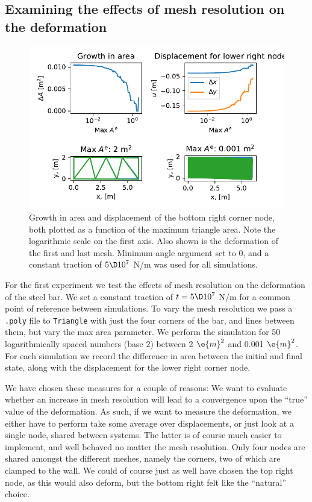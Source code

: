 \documentclass[sigconf]{acmart}
\begin{document}
\subsection{Examining the effects of mesh resolution on the deformation}
\begin{figure}
	\centering
	\includegraphics[width=\linewidth]{ex_resolution.pdf}
	\caption{Growth in area and displacement of the bottom right corner node, both plotted as a function of the maximum triangle area. Note the logarithmic scale on the first axis. Also shown is the deformation of the first and last mesh. Minimum angle argument set to 0, and a constant traction of $ 5\D 10^7 $ N/m was used for all simulations.}
	\label{fig:resolution}
\end{figure}
For the first experiment we test the effects of mesh resolution on the deformation of the steel bar. We set a constant traction of $ t = 5\D 10^7 $ N/m for a common point of reference between simulations. To vary the mesh resolution we pass a \texttt{.poly} file to \texttt{Triangle} with just the four corners of the bar, and lines between them, but vary the max area parameter. We perform the simulation for 50 logarithmically spaced numbers (base 2) between 2 $ \e{m}^2 $ and 0.001 $ \e{m}^2 $. For each simulation we record the difference in area between the initial and final state, along with the displacement for the lower right corner node.

We have chosen these measures for a couple of reasons: We want to evaluate whether an increase in mesh resolution will lead to a convergence upon the ``true'' value of the deformation. As such, if we want to measure the deformation, we either have to perform take some average over displacements, or just look at a single node, shared between systems. The latter is of course much easier to implement, and well behaved no matter the mesh resolution. Only four nodes are shared amongst the different meshes, namely the corners, two of which are clamped to the wall. We could of course just as well have chosen the top right node, as this would also deform, but the bottom right felt like the ``natural'' choice.
\end{document}
